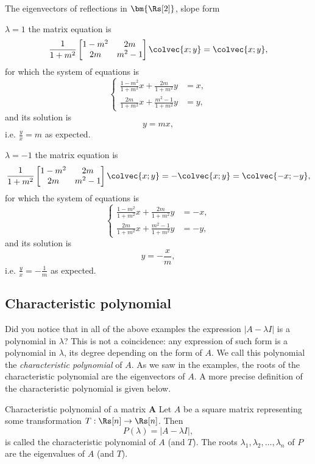 \begin{example}{The eigenvectors of reflections in $\bm{\Rs[2]}$, slope form}{}
	\begin{descitemize}
		\item[$\lambda=1$] the matrix equation is
			\[
				\frac{1}{1+m^{2}}
				\begin{bmatrix}
					1-m^{2} & 2m \\
					2m & m^{2}-1
				\end{bmatrix}\colvec{x;y}=\colvec{x;y},
			\]
			for which the system of equations is
			\[
				\begin{cases}
					\frac{1-m^{2}}{1+m^{2}}x + \frac{2m}{1+m^{2}}y &= x,\\
					\frac{2m}{1+m^{2}}x + \frac{m^{2}-1}{1+m^{2}}y &= y,
				\end{cases}
			\]
			and its solution is
			\[
				y = mx,
			\]
			i.e. $\frac{y}{x}=m$ as expected.

		\item[$\lambda=-1$] the matrix equation is
			\[
				\frac{1}{1+m^{2}}
				\begin{bmatrix}
					1-m^{2} & 2m \\
					2m & m^{2}-1
				\end{bmatrix}\colvec{x;y}=-\colvec{x;y}=\colvec{-x;-y},
			\]
			for which the system of equations is
			\[
				\begin{cases}
					\frac{1-m^{2}}{1+m^{2}}x + \frac{2m}{1+m^{2}}y &= -x,\\
					\frac{2m}{1+m^{2}}x + \frac{m^{2}-1}{1+m^{2}}y &= -y,
				\end{cases}
			\]
			and its solution is
			\[
				y = -\frac{x}{m},
			\]
			i.e. $\frac{y}{x}=-\frac{1}{m}$ as expected.
	\end{descitemize}
\end{example}

\subsection{Characteristic polynomial}
Did you notice that in all of the above examples the expression $\left|A-\lambda I\right|$ is a polynomial in $\lambda$? This is not a coincidence: any expression of such form is a polynomial in $\lambda$, its degree depending on the form of $A$. We call this polynomial the \emph{characteristic polynomial} of $A$. As we saw in the examples, the roots of the characteristic polynomial are the eigenvectors of $A$. A more precise definition of the characteristic polynomial is given below.

\begin{definition}{Characteristic polynomial of a matrix $\bm{A}$}{}
	Let $A$ be a square matrix representing some transformation $T:\Rs[n]\to\Rs[n]$. Then
	\begin{equation}
		P(\lambda)=|A-\lambda I|,
		\label{eq:characteristic_polynomial}
	\end{equation}
	is called the characteristic polynomial of $A$ (and $T$). The roots $\lambda_{1},\lambda_{2},\dots,\lambda_{n}$ of $P$ are the eigenvalues of $A$ (and $T$).
\end{definition}

